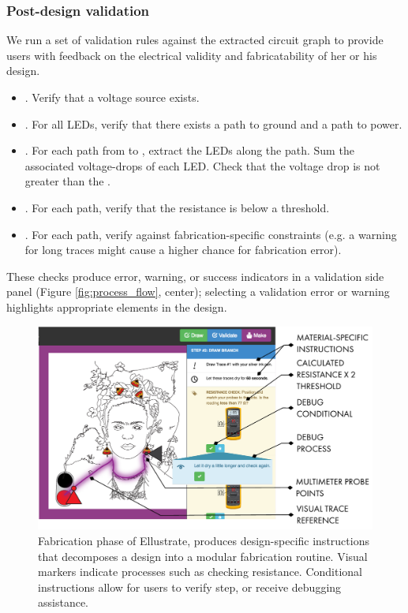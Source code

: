 \documentclass{sigchi}
\begin{document}
    \subsubsection{Post-design validation}
        We run a set of validation rules against the extracted circuit graph to provide users with feedback on the electrical validity and fabricatability of her or his design. 
            \begin{itemize}
                \item {}. Verify that a voltage source exists.
                \item {}. For all LEDs, verify that there exists a path to ground and a path to power.
                \item {}. For each path from  to , extract the LEDs along the path. Sum the associated voltage-drops of each LED. Check that the voltage drop is not greater than the .
                \item {}. For each path, verify that the resistance is below a threshold. 
                \item {}. For each path, verify against fabrication-specific constraints (e.g. a warning for long traces might cause a higher chance for fabrication error).
            \end{itemize}
        These checks produce error, warning, or success indicators in a validation side panel (Figure \ref{fig:process_flow}, center); selecting a validation error or warning highlights appropriate elements in the design. 
    
    \begin{figure}[t]
    \centering
    \includegraphics[width=1.0\columnwidth]{figures/fabtool.pdf}
    \caption{Fabrication phase of Ellustrate, produces design-specific instructions that decomposes a design into a modular fabrication routine. Visual markers indicate processes such as checking resistance. Conditional instructions allow for users to verify step, or receive debugging assistance.}
    \label{fig:fab_tool}
    \vspace{-10pt}
    \end{figure}
\end{document}

